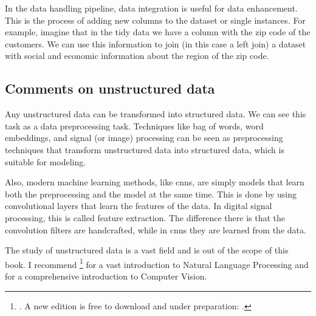 In the data handling pipeline, data integration is useful for data enhancement.  This is
the process of adding new columns to the dataset or single instances.  For example,
imagine that in the tidy data we have a column with the zip code of the customers.  We can
use this information to join (in this case a left join) a dataset with social and economic
information about the region of the zip code.

\subsection{Comments on unstructured data}

Any unstructured data can be transformed into structured data.  We can see this task as a
data preprocessing task.  Techniques like bag of words, word embeddings, and signal (or
image) processing can be seen as preprocessing techniques that transform unstructured data
into structured data, which is suitable for modeling.

Also, modern machine learning methods, like \glspl{cnn}, are simply models that learn both
the preprocessing and the model at the same time.  This is done by using convolutional
layers that learn the features of the data.  In digital signal processing, this is called
feature extraction.  The difference there is that the convolution filters are handcrafted,
while in \glspl{cnn} they are learned from the data.

The study of unstructured data is a vast field and is out of the scope of this book.  I
recommend \citeauthor{Jurafsky2008}\footnote{. A new edition is
free to download and under preparation: .} for a vast
introduction to Natural Language Processing and
\citeauthor{Szeliski2022} for a comprehensive introduction to
Computer Vision.

